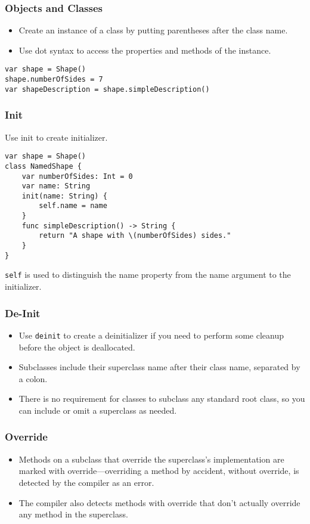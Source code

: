 \begin{frame}[fragile] \frametitle{Objects and Classes}
\begin{itemize}
\item Create an instance of a class by putting parentheses after the class name. 
\item Use dot syntax to access the properties and methods of the instance.
\end{itemize}

\begin{lstlisting}
var shape = Shape()
shape.numberOfSides = 7
var shapeDescription = shape.simpleDescription()
\end{lstlisting}


\end{frame}


\begin{frame}[fragile] \frametitle{Init}
Use init to create initializer.

\begin{lstlisting}
var shape = Shape()
class NamedShape {
    var numberOfSides: Int = 0
    var name: String
    init(name: String) {
        self.name = name
    }
    func simpleDescription() -> String {
        return "A shape with \(numberOfSides) sides."
    }
}
\end{lstlisting}

\lstinline|self| is used to distinguish the name property from the name argument to the initializer. 
\end{frame}


\begin{frame}[fragile] \frametitle{De-Init}
\begin{itemize}
\item Use \lstinline|deinit| to create a deinitializer if you need to perform some cleanup before the object is deallocated.
\item Subclasses include their superclass name after their class name, separated by a colon. 
\item There is no requirement for classes to subclass any standard root class, so you can include or omit a superclass as needed.
\end{itemize}


\end{frame}


\begin{frame}[fragile] \frametitle{Override}
\begin{itemize}
\item Methods on a subclass that override the superclass’s implementation are marked with override—overriding a method by accident, without override, is detected by the compiler as an error. 
\item The compiler also detects methods with override that don’t actually override any method in the superclass.
\end{itemize}


\end{frame}

